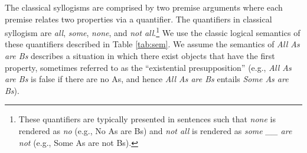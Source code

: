 \documentclass[floatsintext, doc]{apa6}
\newcommand{\mht}[1]{{\textcolor{Blue}{[mht: #1]}}}
\begin{document}
The classical syllogisms are comprised by two premise arguments where each premise relates two properties via a quantifier. 
The quantifiers in classical syllogism are \emph{all}, \emph{some}, \emph{none}, and \emph{not all}.\footnote{
These quantifiers are typically presented in sentences such that \emph{none} is rendered as \emph{no} (e.g., No As are Bs) and \emph{not all} is rendered as \emph{some \_\_ are not} (e.g., Some As are not Bs).
}
We use the classic logical semantics of these quantifiers described in Table \ref{tab:sem}.
We assume the semantics of \emph{All As are Bs} describes a situation in which there exist objects that have the first property, sometimes referred to as the ``existential presupposition'' (e.g., \emph{All As are Bs} is false if there are no As, and hence \emph{All As are Bs} entails \emph{Some As are Bs}). 


\end{document}
